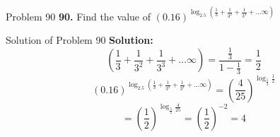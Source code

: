 \documentclass[aspectratio=1610,8pt]{beamer}
\begin{document}
\begin{frame}{Problem 90}
  \textbf{90.} Find the value of $(0.16)^{\log_{2.5}\left(\frac{1}{3} + \frac{1}{3^2} + \frac{1}{3^3} + \ldots \infty\right)}$
\end{frame}
\begin{frame}{Solution of Problem 90}
  \textbf{Solution:} $$\left(\frac{1}{3} + \frac{1}{3^2} + \frac{1}{3^3} + \ldots \infty\right) = \frac{\frac{1}{3}}{1 -
    \frac{1}{3}} = \frac{1}{2}$$
  $$(0.16)^{\log_{2.5}\left(\frac{1}{3} + \frac{1}{3^2} + \frac{1}{3^3} + \ldots \infty\right)} =
  \left(\frac{4}{25}\right)^{\log_{\frac{5}{2}}\frac{1}{2}}$$
  $$= \left(\frac{1}{2}\right)^{\log_{\frac{5}{2}}\frac{4}{25}} = \left(\frac{1}{2}\right)^{-2} = 4$$
\end{frame}
\end{document}
